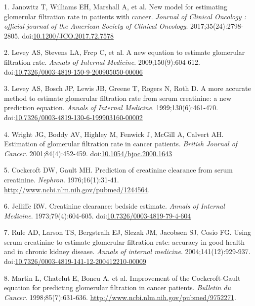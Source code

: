 \documentclass[11pt,]{article}
\begin{document}
\hypertarget{refs}{}
\hypertarget{ref-Janowitz2017a}{}
1. Janowitz T, Williams EH, Marshall A, et al. New model for estimating
glomerular filtration rate in patients with cancer. \emph{Journal of
Clinical Oncology : official journal of the American Society of Clinical
Oncology}. 2017;35(24):2798-2805.
doi:\href{https://doi.org/10.1200/JCO.2017.72.7578}{10.1200/JCO.2017.72.7578}

\hypertarget{ref-Levey2009}{}
2. Levey AS, Stevens LA, Frcp C, et al. A new equation to estimate
glomerular filtration rate. \emph{Annals of Internal Medicine}.
2009;150(9):604-612.
doi:\href{https://doi.org/10.7326/0003-4819-150-9-200905050-00006}{10.7326/0003-4819-150-9-200905050-00006}

\hypertarget{ref-Levey1999}{}
3. Levey AS, Bosch JP, Lewis JB, Greene T, Rogers N, Roth D. A more
accurate method to estimate glomerular filtration rate from serum
creatinine: a new prediction equation. \emph{Annals of Internal
Medicine}. 1999;130(6):461-470.
doi:\href{https://doi.org/10.7326/0003-4819-130-6-199903160-00002}{10.7326/0003-4819-130-6-199903160-00002}

\hypertarget{ref-Wright2001}{}
4. Wright JG, Boddy AV, Highley M, Fenwick J, McGill A, Calvert AH.
Estimation of glomerular filtration rate in cancer patients.
\emph{British Journal of Cancer}. 2001;84(4):452-459.
doi:\href{https://doi.org/10.1054/bjoc.2000.1643}{10.1054/bjoc.2000.1643}

\hypertarget{ref-Cockcroft1976}{}
5. Cockcroft DW, Gault MH. Prediction of creatinine clearance from serum
creatinine. \emph{Nephron}. 1976;16(1):31-41.
\url{http://www.ncbi.nlm.nih.gov/pubmed/1244564}.

\hypertarget{ref-Jelliffe1973}{}
6. Jelliffe RW. Creatinine clearance: bedside estimate. \emph{Annals of
Internal Medicine}. 1973;79(4):604-605.
doi:\href{https://doi.org/10.7326/0003-4819-79-4-604}{10.7326/0003-4819-79-4-604}

\hypertarget{ref-Rule2004}{}
7. Rule AD, Larson TS, Bergstralh EJ, Slezak JM, Jacobsen SJ, Cosio FG.
Using serum creatinine to estimate glomerular filtration rate: accuracy
in good health and in chronic kidney disease. \emph{Annals of internal
medicine}. 2004;141(12):929-937.
doi:\href{https://doi.org/10.7326/0003-4819-141-12-200412210-00009}{10.7326/0003-4819-141-12-200412210-00009}

\hypertarget{ref-Martin1998}{}
8. Martin L, Chatelut E, Boneu A, et al. Improvement of the
Cockcroft-Gault equation for predicting glomerular filtration in cancer
patients. \emph{Bulletin du Cancer}. 1998;85(7):631-636.
\url{http://www.ncbi.nlm.nih.gov/pubmed/9752271}.
\end{document}
